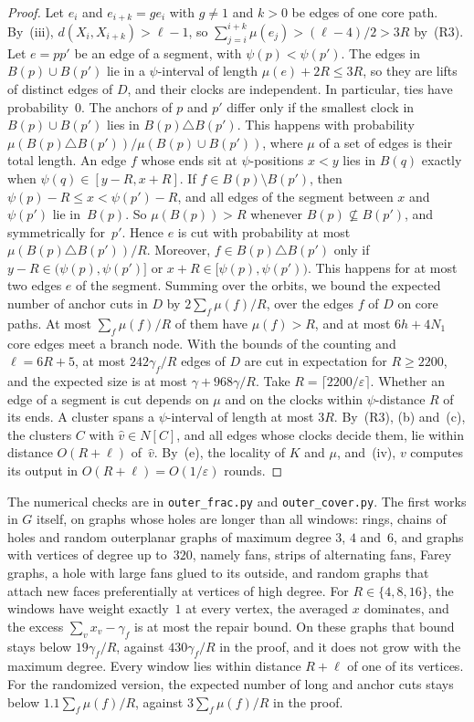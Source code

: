 \documentclass[11pt]{article}
\theoremstyle{remark}
\begin{document}
\begin{proof}
Let $e_i$ and $e_{i+k}=ge_i$ with $g\ne1$ and $k>0$ be edges of one core path. By~(iii),
$d(X_i,X_{i+k})>\ell-1$, so $\sum_{j=i}^{i+k}\mu(e_j)>(\ell-4)/2>3R$ by~(R3). Let $e=pp'$ be an edge of a segment, with $\psi(p)<\psi(p')$. The
edges in $B(p)\cup B(p')$ lie in a $\psi$-interval of length $\mu(e)+2R\le3R$, so they are lifts of
distinct edges of $D$, and their clocks are independent. In particular, ties have probability~$0$. The anchors of $p$ and $p'$ differ only if
the smallest clock in $B(p)\cup B(p')$ lies in $B(p)\triangle B(p')$. This happens with probability
$\mu(B(p)\triangle B(p'))/\mu(B(p)\cup B(p'))$, where $\mu$ of a set of edges is their total length.
An edge $f$ whose ends sit at $\psi$-positions $x<y$ lies in $B(q)$ exactly when
$\psi(q)\in[y-R,x+R]$. If $f\in B(p)\setminus B(p')$, then $\psi(p)-R\le x<\psi(p')-R$, and all edges of the
segment between $x$ and $\psi(p')$ lie in~$B(p)$. So $\mu(B(p))>R$ whenever $B(p)\not\subseteq B(p')$,
and symmetrically for~$p'$. Hence $e$ is cut with probability at most $\mu(B(p)\triangle B(p'))/R$.
Moreover,
$f\in B(p)\triangle B(p')$ only if $y-R\in(\psi(p),\psi(p')]$ or $x+R\in[\psi(p),\psi(p'))$. This happens for
at most two edges $e$ of the segment. Summing over the orbits, we bound the expected number of anchor cuts in $D$
by $2\sum_f\mu(f)/R$, over the edges $f$ of $D$ on core paths. At most $\sum_f\mu(f)/R$ of them have
$\mu(f)>R$, and at most $6h+4N_1$ core edges meet a branch node. With the bounds of the counting
and $\ell=6R+5$, at most $242\gamma_f/R$ edges of $D$ are cut in expectation for $R\ge2200$, and the
expected size is at most $\gamma+968\gamma/R$. Take $R=\lceil2200/\varepsilon\rceil$. Whether an edge
of a segment is cut depends on $\mu$ and on the clocks within $\psi$-distance $R$ of its ends. A
cluster spans a $\psi$-interval of length at most $3R$. By~(R3), (b) and~(c), the clusters $C$ with
$\hat v\in N[C]$, and all edges whose clocks decide them, lie within distance $O(R+\ell)$
of~$\hat v$. By~(e), the locality of $K$ and $\mu$, and~(iv), $v$ computes its output in
$O(R+\ell)=O(1/\varepsilon)$ rounds.
\end{proof}

The numerical checks are in \texttt{outer\_frac.py} and \texttt{outer\_cover.py}. The first works
in $G$ itself, on graphs whose holes are longer than all windows: rings, chains of holes and random
outerplanar graphs of maximum degree $3$, $4$ and~$6$, and graphs with vertices of degree up to~$320$,
namely fans, strips of alternating fans, Farey graphs, a hole with large fans glued to its outside,
and random graphs that attach new faces preferentially at vertices of high degree. For
$R\in\{4,8,16\}$, the windows have weight exactly~$1$ at every vertex, the averaged $x$ dominates,
and the excess $\sum_vx_v-\gamma_f$ is at most the repair bound. On these graphs that bound stays
below $19\gamma_f/R$, against $430\gamma_f/R$ in the proof, and it does not grow with the maximum
degree. Every window lies within distance $R+\ell$ of one of its vertices. For the randomized
version, the expected number of long and anchor cuts stays below $1.1\sum_f\mu(f)/R$, against
$3\sum_f\mu(f)/R$ in the proof.
\end{document}
